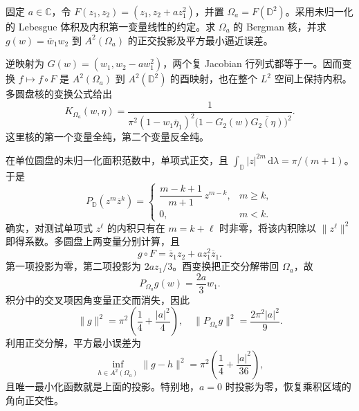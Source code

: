 \begin{exercise}[剪切域上的核与投影]\label{b3:ex:29-6}
固定 \(a\in\mathbb C\)，令 \(F(z_1,z_2)=(z_1,z_2+az_1^2)\)，并置 \(\Omega_a=F(\mathbb D^2)\)。采用未归一化的 Lebesgue 体积及内积第一变量线性的约定。求 \(\Omega_a\) 的 Bergman 核，并求 \(g(w)=\overline w_1w_2\) 到 \(A^2(\Omega_a)\) 的正交投影及平方最小逼近误差。
\end{exercise}
\begin{solution}
逆映射为 \(G(w)=(w_1,w_2-aw_1^2)\)，两个复 Jacobian 行列式都等于一。因而变换 \(f\mapsto f\circ F\) 是 \(A^2(\Omega_a)\) 到 \(A^2(\mathbb D^2)\) 的酉映射，也在整个 \(L^2\) 空间上保持内积。多圆盘核的变换公式给出
\[
 K_{\Omega_a}(w,\eta)=
 \frac1{\pi^2(1-w_1\overline\eta_1)^2
  \bigl(1-G_2(w)\overline{G_2(\eta)}\bigr)^2}.
\]
这里核的第一个变量全纯，第二个变量反全纯。

在单位圆盘的未归一化面积范数中，单项式正交，且
\(\int_{\mathbb D}|z|^{2m}\,\mathrm d\lambda=\pi/(m+1)\)。于是
\[
 P_{\mathbb D}(z^m\overline z^k)=
 \begin{cases}
 \dfrac{m-k+1}{m+1}\,z^{m-k},&m\ge k,\\
 0,&m<k.
 \end{cases}
\]
确实，对测试单项式 \(z^\ell\) 的内积只有在 \(m=k+\ell\) 时非零，将该内积除以 \(\lVert z^\ell\rVert^2\) 即得系数。多圆盘上两变量分别计算，且
\[
 g\circ F=\overline z_1z_2+a z_1^2\overline z_1.
\]
第一项投影为零，第二项投影为 \(2az_1/3\)。酉变换把正交分解带回 \(\Omega_a\)，故
\[
 P_{\Omega_a}g(w)=\frac{2a}{3}w_1.
\]
积分中的交叉项因角变量正交而消失，因此
\[
 \lVert g\rVert^2=\pi^2\left(\frac14+\frac{|a|^2}{4}\right),\quad
 \lVert P_{\Omega_a}g\rVert^2=\frac{2\pi^2|a|^2}{9}.
\]
利用正交分解，平方最小误差为
\[
 \inf_{h\in A^2(\Omega_a)}\lVert g-h\rVert^2
 =\pi^2\left(\frac14+\frac{|a|^2}{36}\right),
\]
且唯一最小化函数就是上面的投影。特别地，\(a=0\) 时投影为零，恢复乘积区域的角向正交性。
\end{solution}

